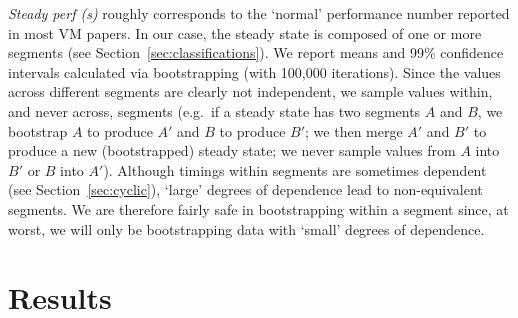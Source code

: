 \documentclass[acmlarge]{acmart}\settopmatter{printfolios=true}
\begin{document}
\emph{Steady perf (s)} roughly corresponds to the `normal' performance number reported
in most VM papers. In our case, the steady state is composed of one or more
segments (see Section~\ref{sec:classifications}). We report means and
99\% confidence intervals
calculated via bootstrapping (with 100,000 iterations). Since the values across different segments are clearly not
independent, we sample values within, and never across, segments (e.g.~if a
steady state has two segments $A$ and $B$, we bootstrap $A$ to produce $A'$ and
$B$ to produce $B'$; we then merge $A'$ and $B'$ to produce a new (bootstrapped)
steady state; we never sample values from $A$ into $B'$ or $B$ into $A'$).
Although timings within segments are sometimes dependent (see
Section~\ref{sec:cyclic}), `large' degrees of dependence lead to
non-equivalent segments. We are therefore fairly safe in bootstrapping
within a segment since, at worst, we will only be bootstrapping data with
`small' degrees of dependence.


\section{Results}
\label{sec:results}
\end{document}
